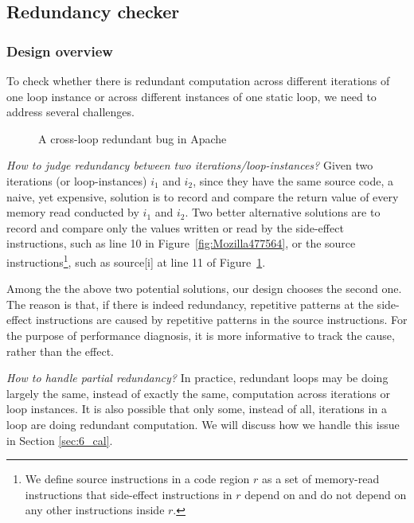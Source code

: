 \subsection{Redundancy checker}
\label{sec:6_redundant}

\subsubsection{Design overview}
To check whether there is redundant computation across different iterations
of one loop instance or across different instances of one static loop, we need
to address several challenges.

\begin{figure}
\caption{A cross-loop redundant bug in Apache}
\label{fig:Apache34464}
\end{figure}




\emph{How to judge redundancy between two iterations/loop-instances?}
Given two iterations (or loop-instances) $i_1$ and $i_2$, since they have 
the same source code, 
a naive, yet expensive, solution is to record and compare the return value of
every memory read conducted by $i_1$ and $i_2$. Two better alternative
solutions are to record and compare only the values written or read by the
side-effect instructions, such as 
line 10 in Figure~\ref{fig:Mozilla477564},
or the source instructions\footnote{We define source instructions in a code
region $r$ as a set of memory-read instructions that side-effect
instructions in $r$ depend on and do not depend on any other instructions
inside $r$.}, 
such as source[i] at line 11 of Figure~\ref{fig:Apache34464}.

Among the the above two potential solutions, our design chooses the second one.
The reason is that, if there is indeed
redundancy, repetitive patterns at the side-effect instructions are caused by
repetitive patterns in the source instructions.
For the purpose of performance diagnosis, it is
more informative to track the cause, rather than the effect.

\emph{How to handle partial redundancy?}
In practice, redundant loops may be doing largely the same, instead of exactly
the same, computation across iterations or loop instances. It is also possible
that only some, instead of all, iterations in a loop are doing redundant
computation. We will discuss how we handle this issue in Section \ref{sec:6_cal}.



